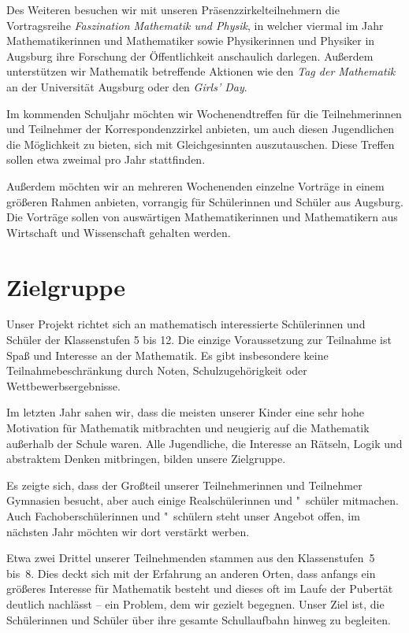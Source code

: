 \documentclass[12pt]{zettel}
\begin{document}
Des Weiteren besuchen wir mit unseren Präsenzzirkelteilnehmern die
Vortragsreihe \emph{Faszination Mathematik und Physik}, in welcher viermal im
Jahr Mathematikerinnen und Mathematiker sowie Physikerinnen und Physiker in Augsburg ihre Forschung der
Öffentlichkeit anschaulich darlegen. Außerdem unterstützen wir
Mathematik betreffende Aktionen wie den \emph{Tag der Mathematik} an
der Universität Augsburg oder den \emph{Girls' Day}.

Im kommenden Schuljahr möchten wir Wochenendtreffen für die Teilnehmerinnen und
Teilnehmer der Korrespondenzzirkel anbieten, um auch diesen Jugendlichen die
Möglichkeit zu bieten, sich mit Gleichgesinnten auszutauschen. Diese Treffen
sollen etwa zweimal pro Jahr stattfinden.

Außerdem möchten wir an mehreren Wochenenden einzelne Vorträge in einem
größeren Rahmen anbieten, vorrangig für Schülerinnen und Schüler aus Augsburg.
Die Vorträge sollen von auswärtigen Mathematikerinnen und Mathematikern aus
Wirtschaft und Wissenschaft gehalten werden.


\section{Zielgruppe}

Unser Projekt richtet sich an mathematisch interessierte Schülerinnen
und Schüler der Klassenstufen 5 bis 12. Die einzige Voraussetzung zur
Teilnahme ist Spaß und Interesse an der Mathematik. Es gibt insbesondere
keine Teilnahmebeschränkung durch Noten, Schulzugehörigkeit oder
Wettbewerbsergebnisse.

Im letzten Jahr sahen wir, dass die meisten unserer Kinder eine
sehr hohe Motivation für Mathematik mitbrachten und neugierig auf die
Mathematik außerhalb der Schule waren. Alle Jugendliche, die Interesse an
Rätseln, Logik und abstraktem Denken mitbringen, bilden unsere
Zielgruppe.

Es zeigte sich, dass der Großteil unserer Teilnehmerinnen und
Teilnehmer Gymnasien besucht, aber auch einige Realschülerinnen und "~schüler mitmachen.
Auch Fachoberschülerinnen und "~schülern steht unser Angebot offen, im nächsten
Jahr möchten wir dort verstärkt werben.

Etwa zwei Drittel unserer Teilnehmenden
stammen aus den Klassenstufen~5 bis~8.
Dies deckt sich mit der
Erfahrung an anderen Orten, dass anfangs ein größeres Interesse für
Mathematik besteht und dieses oft im Laufe der Pubertät
deutlich nachlässt -- ein Problem, dem wir gezielt begegnen. Unser Ziel ist, die Schülerinnen und Schüler über ihre gesamte Schullaufbahn hinweg zu begleiten.
\end{document}
